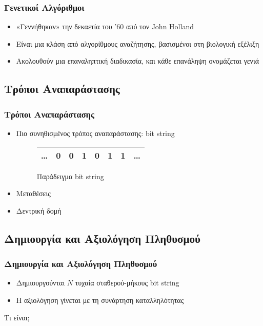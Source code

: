 \documentclass[xetex,mathserif,serif,14pt]{beamer}
\begin{document}
\begin{frame}
\frametitle{Γενετικοί Αλγόριθμοι}
\begin{itemize}
  \item «Γεννήθηκαν» την δεκαετία του '60 από τον John Holland\pause
  \item Είναι μια κλάση από αλγορίθμους αναζήτησης, βασισμένοι στη βιολογική εξέλιξη\pause
  \item Ακολουθούν μια επαναληπτική διαδικασία, και κάθε επανάληψη ονομάζεται γενιά
\end{itemize}
\end{frame}

\subsection{Τρόποι Αναπαράστασης}

\begin{frame}
\frametitle{Τρόποι Αναπαράστασης}
\begin{itemize}
  \item Πιο συνηθισμένος τρόπος αναπαράστασης: bit string
  \begin{figure}
    \renewcommand{\arraystretch}{1.3}
    \label{fig_bit_string}
    \centering
    \begin{tabular}{c|c|c|c|c|c|c|c}
        \hline
        \ldots & 0 & 0 & 1 & 0 & 1 & 1 & \ldots\\
        \hline
    \end{tabular}
    \caption{Παράδειγμα bit string}
  \end{figure}
  \item Μεταθέσεις
  \item Δεντρική δομή
\end{itemize}
\end{frame}

\subsection{Δημιουργία και Αξιολόγηση Πληθυσμού}

\begin{frame}
\frametitle{Δημιουργία και Αξιολόγηση Πληθυσμού}
\begin{itemize}
  \item Δημιουργούνται $N$ τυχαία σταθερού-μήκους bit string
  \item Η αξιολόγηση γίνεται με τη συνάρτηση καταλληλότητας
\end{itemize}
Τι είναι;
\end{frame}
\end{document}
